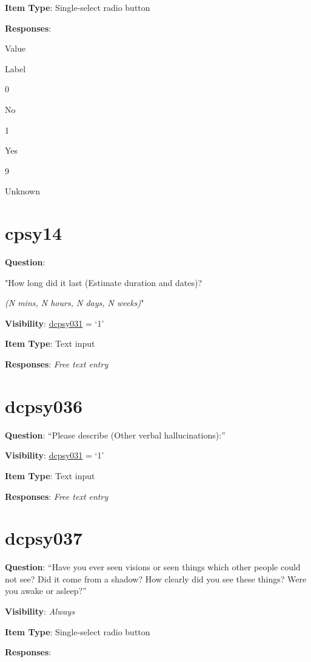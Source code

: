 \documentclass[]{book}
\begin{document}
\textbf{Item Type}: Single-select radio button

\textbf{Responses}:

Value

Label

0

No

1

Yes

9

Unknown

\hypertarget{cpsy14}{%
\section{cpsy14}\label{cpsy14}}

\textbf{Question}:

"How long did it last (Estimate duration and dates)?

\emph{(N mins, N hours, N days, N weeks)}"

\textbf{Visibility}: \protect\hyperlink{dcpsy031}{dcpsy031} = `1'

\textbf{Item Type}: Text input

\textbf{Responses}: \emph{Free text entry}

\hypertarget{dcpsy036}{%
\section{dcpsy036}\label{dcpsy036}}

\textbf{Question}: ``Please describe (Other verbal hallucinations):''

\textbf{Visibility}: \protect\hyperlink{dcpsy031}{dcpsy031} = `1'

\textbf{Item Type}: Text input

\textbf{Responses}: \emph{Free text entry}

\hypertarget{dcpsy037}{%
\section{dcpsy037}\label{dcpsy037}}

\textbf{Question}: ``Have you ever seen visions or seen things which other people could not see? Did it come from a shadow? How clearly did you see these things? Were you awake or asleep?''

\textbf{Visibility}: \emph{Always}

\textbf{Item Type}: Single-select radio button

\textbf{Responses}:
\end{document}
